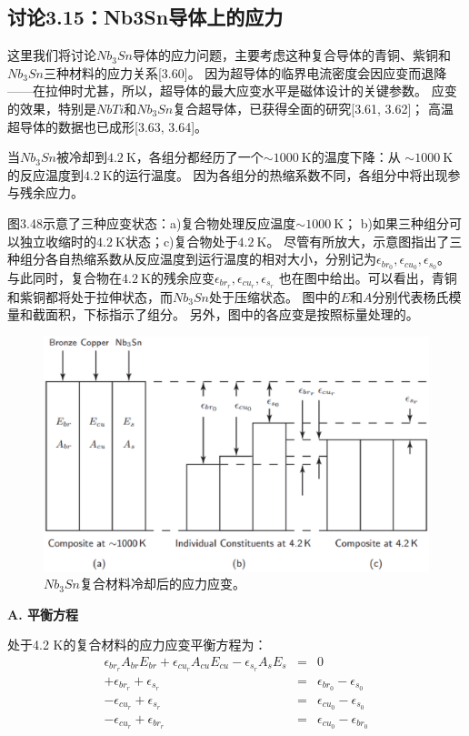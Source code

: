 \subsection{讨论3.15：Nb3Sn导体上的应力}
这里我们将讨论$Nb_3Sn$导体的应力问题，主要考虑这种复合导体的青铜、紫铜和$Nb_3Sn$三种材料的应力关系[3.60]。
因为超导体的临界电流密度会因应变而退降——在拉伸时尤甚，所以，超导体的最大应变水平是磁体设计的关键参数。
应变的效果，特别是$NbTi$和$Nb_3Sn$复合超导体，已获得全面的研究[3.61, 3.62]；
高温超导体的数据也已成形[3.63, 3.64]。

当$Nb_3Sn$被冷却到$4.2\ \mathrm{K}$，各组分都经历了一个$\sim 1000\ \mathrm{K}$的温度下降：从
$\sim 1000\ \mathrm{K}$的反应温度到$4.2\ \mathrm{K}$的运行温度。
因为各组分的热缩系数不同，各组分中将出现参与残余应力。

图3.48示意了三种应变状态：a)复合物处理反应温度$\sim 1000\ \mathrm{K}$；
b)如果三种组分可以独立收缩时的$4.2\ \mathrm{K}$状态；c)复合物处于$4.2\ \mathrm{K}$。
尽管有所放大，示意图指出了三种组分各自热缩系数从反应温度到运行温度的相对大小，分别记为$\epsilon_{br_0},\epsilon_{cu_0}, \epsilon_{s_0}$。
与此同时，复合物在$4.2\ \mathrm{K}$的残余应变$\epsilon_{br_r},\epsilon_{cu_r}, \epsilon_{s_r}$
也在图中给出。可以看出，青铜和紫铜都将处于拉伸状态，而$Nb_3Sn$处于压缩状态。
图中的$E$和$A$分别代表杨氏模量和截面积，下标指示了组分。
另外，图中的各应变是按照标量处理的。
\begin{figure}[htbp]
	\centering
	\includegraphics[scale=0.5]{chpt3/figs/fig3.48.eps}
	\caption{$Nb_3Sn$复合材料冷却后的应力应变。}
\end{figure}

\textbf{A. 平衡方程}

处于4.2 K的复合材料的应力应变平衡方程为：
\begin{eqnarray}%
\epsilon_{br_r}A_{br}E_{br}+\epsilon_{cu_r}A_{cu}E_{cu}-\epsilon_{s_r}A_sE_s&=&0\\
+\epsilon_{br_r}+\epsilon_{s_r}&=&\epsilon_{br_0}-\epsilon_{s_0}\\
-\epsilon_{cu_r}+\epsilon_{s_r}&=&\epsilon_{cu_0}-\epsilon_{s_0}\\
-\epsilon_{cu_r}+\epsilon_{br_r}&=&\epsilon_{cu_0}-\epsilon_{br_0}
\end{eqnarray}

